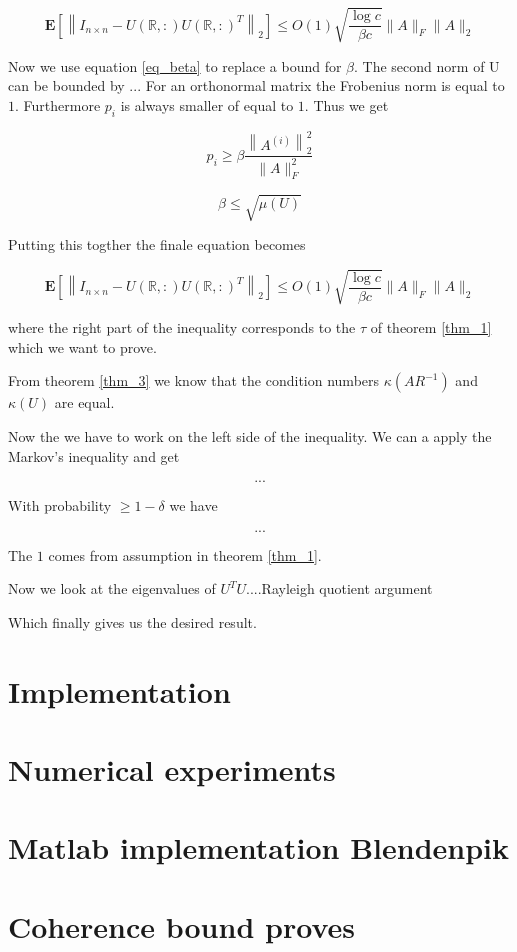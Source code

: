 \documentclass{article}
\begin{document}
\begin{equation} \label{eq_intermed1}
\mathbf{E}\left[\left\|I_{n \times n}-U(\mathbb{R},:)U(\mathbb{R},:)^T\right\|_2\right] \leq O(1)
\sqrt{\frac{\log c}{\beta c}}\|A\|_{F}\|A\|_{2}
\end{equation}

Now we use equation \ref{eq_beta} to replace a bound for $\beta$. The second norm of U
can be bounded by ... For an orthonormal matrix the Frobenius norm is equal to
$1$. Furthermore $p_i$ is always smaller of equal to $1$. Thus we get

\begin{equation} \label{eq_beta}
p_i \geq \beta \frac{\left\|A^{(i)}\right\|^2_2}{\|A\|_{F}^2}
\end{equation}

\begin{equation} \label{eq_beta}
\beta \leq \sqrt{\mu(U)} 
\end{equation}

Putting this togther the finale equation becomes

\begin{equation} \label{eq_intermed2}
\mathbf{E}\left[\left\|I_{n \times n}-U(\mathbb{R},:)U(\mathbb{R},:)^T\right\|_{2}\right] \leq O(1) \sqrt{\frac{\log c}{\beta c}}\|A\|_{F}\|A\|_{2}
\end{equation}

where the right part of the inequality corresponds to the $\tau$ of theorem \ref{thm_1} which we want to prove.

From theorem \ref{thm_3} we know that the condition numbers  $\kappa(AR^{-1})$ and $\kappa(U)$ are equal.

Now the we have to work on the left side of the inequality. We can a apply the Markov's inequality and get

\begin{equation} \label{eq_intermed3}
...
\end{equation}

With probability $\geq 1- \delta$ we have

\begin{equation} \label{eq_intermed4}
...
\end{equation}


The $1$ comes from assumption in theorem \ref{thm_1}.

Now we look at the eigenvalues of $U^TU$....Rayleigh quotient argument


Which finally gives us the desired result.


\section{Implementation} \label{impl}

\section{Numerical experiments} \label{num_exp}

 


\appendix
\section{Matlab implementation Blendenpik} \label{app_code}
\section{Coherence bound proves} \label{app_coh}
\end{document}

